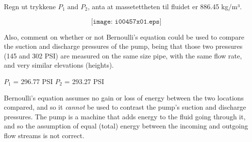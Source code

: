 

Regn ut trykkene $P_1$ and $P_2$, anta at massetettheten til fluidet er 886.45 kg/m³.             

$$\texttt{[image: i00457x01.eps]}$$

Also, comment on whether or not Bernoulli's equation could be used to compare the suction and discharge pressures of the pump, being that those two pressures (145 and 302 PSI) are measured on the same size pipe, with the same flow rate, and very similar elevations (heights).







$P_1$ = 296.77 PSI \hskip 30pt $P_2$ = 293.27 PSI

\vskip 10pt

Bernoulli's equation assumes no gain or loss of energy between the two locations compared, and so it {\it cannot} be used to contrast the pump's suction and discharge pressures.  The pump is a machine that adds energy to the fluid going through it, and so the assumption of equal (total) energy between the incoming and outgoing flow streams is not correct.










